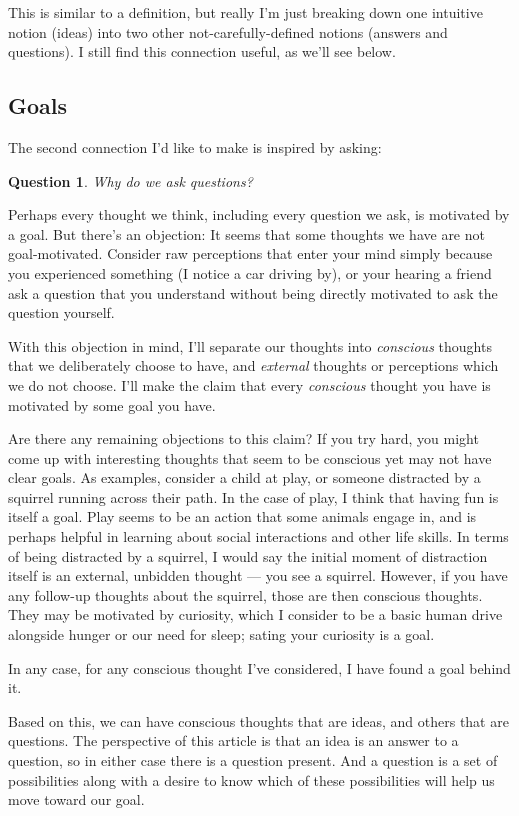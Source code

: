 \documentclass[11pt, oneside]{article}   	%
\newtheorem{question}{Question}
\begin{document}
This is similar to a definition, but really I'm just breaking down
one intuitive notion (ideas) into two other not-carefully-defined notions
(answers and questions). I still find this connection useful, as we'll see
below.

\subsection{Goals}

The second connection I'd like to make is inspired by asking:
\begin{question}
    Why do we ask questions?
\end{question}

Perhaps every thought we think, including every question we ask,
is motivated by a goal.
But there's an objection: It seems that some thoughts
we have are not goal-motivated.
Consider raw perceptions that enter your mind simply because
you experienced something (I notice a car driving by),
or your hearing a friend ask a question
that you understand without being directly motivated to ask
the question yourself.

With this objection in mind, I'll separate our thoughts into
{\em conscious} thoughts that we deliberately choose to have,
and {\em external} thoughts or perceptions which we do not choose.
I'll make the claim that every {\em conscious} thought you have
is motivated by some goal you have.

Are there any remaining objections to this claim?
If you try hard, you might come up with interesting 
thoughts that seem to be conscious yet may not have
clear goals. As examples, consider a child at play, or
someone distracted by a squirrel running across their path.
In the case of play, I think that having fun is itself a goal.
Play seems to be an action that some animals engage in, and
is perhaps helpful in learning about social interactions and
other life skills. In terms of being distracted by a squirrel,
I would say the initial moment of distraction itself is an
external, unbidden thought --- you see a squirrel. However,
if you have any follow-up thoughts about the squirrel, those
are then conscious thoughts. They may be motivated by
curiosity, which I consider to be a basic human drive alongside
hunger or our need for sleep; sating your curiosity is a goal.

In any case, for any conscious thought I've considered, I
have found a goal behind it.

Based on this, we can have conscious thoughts that are ideas, and others that
are questions. The perspective of this article is that an idea is an answer to a
question, so in either case there is a question present. And a question is a set
of possibilities along with a desire to know which of these possibilities will
help us move toward our goal.
\end{document}
